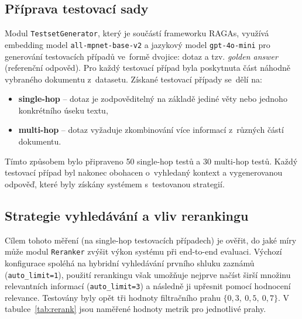 \subsection{Příprava testovací sady}
Modul \texttt{TestsetGenerator}, který je součástí frameworku RAGAs, využívá embedding model \texttt{all-mpnet-base-v2} a jazykový model \texttt{gpt-4o-mini} pro generování testovacích případů ve~formě dvojice: dotaz a tzv. \textit{golden answer} (referenční odpověd). Pro každý testovací případ byla poskytnuta část náhodně vybraného dokumentu z~datasetu. Získané testovací případy se~dělí na:
\begin{itemize}
    \item \textbf{single-hop} – dotaz je zodpověditelný na základě jediné věty nebo jednoho konkrétního úseku textu,
    \item \textbf{multi-hop} – dotaz vyžaduje zkombinování více informací z~různých částí dokumentu.
\end{itemize}
Tímto způsobem bylo připraveno 50 single-hop testů a 30 multi-hop testů. Každý testovací případ byl nakonec obohacen o~vyhledaný kontext a vygenerovanou odpověď, které byly získány systémem s~testovanou strategií.

\subsection{Strategie vyhledávání a vliv rerankingu}
\label{cutoff}
Cílem tohoto měření (na single-hop testovacích případech) je ověřit, do jaké míry může modul \texttt{Reranker} zvýšit výkon systému při end-to-end evaluaci. Výchozí konfigurace spoléhá na hybridní vyhledávání prvního shluku zaznámů (\texttt{auto\_limit=1}), použití rerankingu však umožňuje nejprve načíst širší množinu relevantních informací (\texttt{auto\_limit=3}) a následně ji upřesnit pomocí hodnocení relevance. Testovány byly opět tři hodnoty filtračního prahu $\{0{,}3,\ 0{,}5,\ 0{,}7\}$. V tabulce~\ref{tab:rerank} jsou naměřené hodnoty metrik pro jednotlivé prahy.

